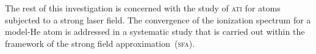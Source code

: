 The rest of this investigation is concerned with the study of
\textsc{ati} for atoms subjected to a strong laser field. The
convergence of the ionization spectrum for a model-He atom is
addressed in a systematic study that is carried out within the
framework of the strong field approximation~(\textsc{sfa}).


























































